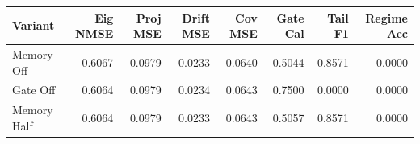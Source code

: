 \begin{tabular}{lrrrrrrr}
\toprule
Variant & Eig NMSE & Proj MSE & Drift MSE & Cov MSE & Gate Cal & Tail F1 & Regime Acc \\
\midrule
Memory Off & 0.6067 & 0.0979 & 0.0233 & 0.0640 & 0.5044 & 0.8571 & 0.0000 \\
Gate Off & 0.6064 & 0.0979 & 0.0234 & 0.0643 & 0.7500 & 0.0000 & 0.0000 \\
Memory Half & 0.6064 & 0.0979 & 0.0233 & 0.0643 & 0.5057 & 0.8571 & 0.0000 \\
\bottomrule
\end{tabular}